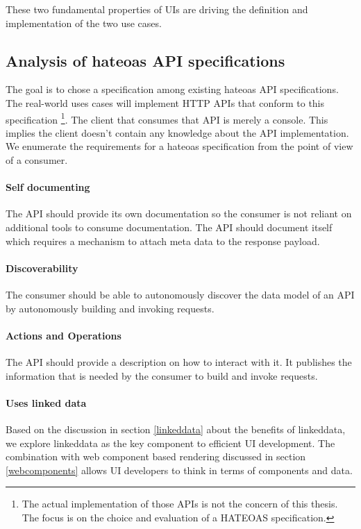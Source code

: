 These two fundamental properties of UIs are driving the definition and implementation of the two use cases.

\subsection{Analysis of \gls{hateoas} API specifications}\label{sec:analysishateoas}
The goal is to chose a specification among existing \gls{hateoas} API specifications. The real-world uses cases will implement HTTP APIs that conform to this specification \footnote{The actual implementation of those APIs is not the concern of this thesis. The focus is on the choice and evaluation of a HATEOAS specification.}. The client that consumes that API is merely a \gls{console}. This implies the client doesn't contain any knowledge about the API implementation. \\
We enumerate the requirements for a \gls{hateoas} specification from the point of view of a consumer.

\paragraph{Self documenting}
The API should provide its own documentation so the consumer is not reliant on additional tools to consume documentation. The API should document itself which requires a mechanism to attach meta data to the response payload.

\paragraph{Discoverability}
The consumer should be able to autonomously discover the data model of an API by autonomously building and invoking requests.

\paragraph{Actions and Operations}
The API should provide a description on how to interact with it. It publishes the information that is needed by the consumer to build and invoke requests.

\paragraph{Uses linked data}
Based on the discussion in section \ref{linkeddata} about the benefits of \gls{linkeddata}, we explore \gls{linkeddata} as the key component to efficient UI development. The combination with web component based rendering discussed in section \ref{webcomponents} allows UI developers to think in terms of components and data.

